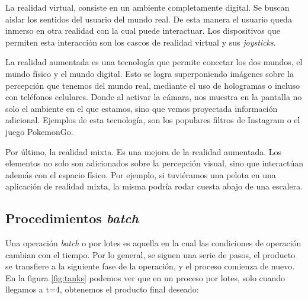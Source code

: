 
La realidad virtual, consiste en un ambiente completamente digital. Se buscan aislar los sentidos del usuario del mundo real. De esta manera el usuario queda inmerso en otra realidad con la cual puede interactuar. Los dispositivos que permiten esta interacción son los cascos de realidad virtual y sus \textit{joysticks}.

La realidad aumentada es una tecnología que permite conectar los dos mundos, el mundo físico y el mundo digital. Esto se logra superponiendo imágenes sobre la percepción que tenemos del mundo real, mediante el uso de hologramas o incluso con teléfonos celulares. Donde al activar la cámara, nos muestra en la pantalla no solo el ambiente en el que estamos, sino que vemos proyectada información adicional. Ejemplos de esta tecnología, son los populares filtros de Instagram o el juego PokemonGo.

Por último, la realidad mixta. Es una mejora de la realidad aumentada. Los elementos no solo son adicionados sobre la percepción visual, sino que interactúan además con el espacio físico. Por ejemplo, si tuviéramos una pelota en una aplicación de realidad mixta, la misma podría rodar cuesta abajo de una escalera.


\subsection{Procedimientos \textit{batch}}

Una operación \textit{batch} o por lotes es aquella en la cual las condiciones de operación cambian con el tiempo. Por lo general, se siguen una serie de pasos, el producto se transfiere a la siguiente fase de la operación, y el proceso comienza de nuevo. En la figura \ref{fig:tanks} podemos ver que en un proceso por lotes, solo cuando llegamos a t=4, obtenemos el producto final deseado:

